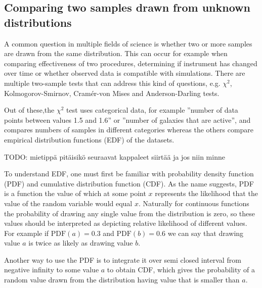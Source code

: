 \documentclass[english, oneside]{HYgradu}
\begin{document}
\subsection{Comparing two samples drawn from unknown distributions}

A common question in multiple fields of science is whether two or more samples are drawn from the same distribution. This can occur for example when comparing effectiveness of two procedures, determining if instrument has changed over time or whether observed data is compatible with simulations. There are multiple two-sample tests that can address this kind of questions, e.g. $\chi^2$, Kolmogorov-Smirnov, Cram\'er-von Mises and Anderson-Darling tests. \citep{bohm2010introduction, feigelson2012modern}

Out of these,the  $\chi^2$ test uses categorical data, for example ''number of data points between values 1.5 and 1.6'' or ''number of galaxies that are active'', and compares numbers of samples in different categories whereas the others compare empirical distribution functions (EDF) of the datasets. \cite{feigelson2012modern}

TODO: mietippä pitäisikö seuraavat kappaleet siirtää ja jos niin minne

To understand EDF, one must first be familiar with probability density function (PDF) and cumulative distribution function (CDF). As the name suggests, PDF is a function the value of which at some point $x$ represents the likelihood that the value of the random variable would equal $x$. Naturally for continuous functions the probability of drawing any single value from the distribution is zero, so these values should be interpreted as depicting relative likelihood of different values. For example if $\mathrm{PDF}(a)=0.3$ and $\mathrm{PDF}(b)=0.6$ we can say that drawing value $a$ is twice as likely as drawing value $b$. \citep{htk}

Another way to use the PDF is to integrate it over semi closed interval from negative infinity to some value $a$ to obtain CDF, which gives the probability of a random value drawn from the distribution having value that is smaller than $a$. %
\end{document}
